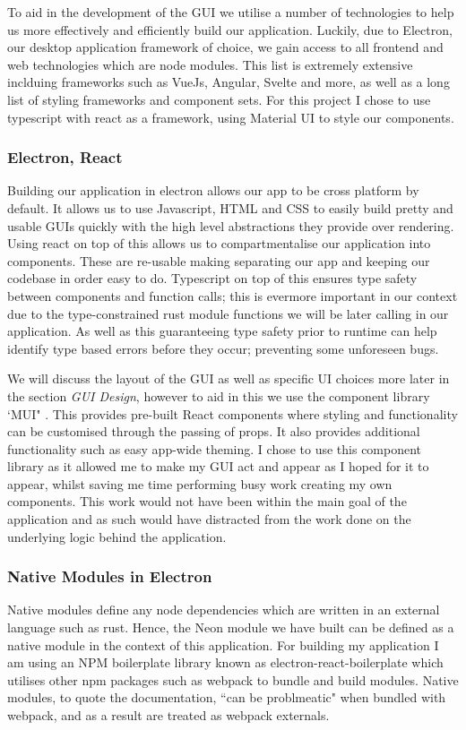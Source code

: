 \documentclass[a4paper,11pt]{article}
\begin{document}
To aid in the development of the GUI we utilise a number of technologies to help us more effectively and efficiently build our application. Luckily, due to Electron, our desktop application framework of choice, we gain access to all frontend and web technologies which are node modules. This list is extremely extensive inclduing frameworks such as VueJs, Angular, Svelte and more, as well as a long list of styling frameworks and component sets. For this project I chose to use typescript with react as a framework, using Material UI \cite{mui} to style our components.
\subsubsection{Electron, React}
Building our application in electron allows our app to be cross platform by default. It allows us to use Javascript, HTML and CSS to easily build pretty and usable GUIs quickly with the high level abstractions they provide over rendering. Using react on top of this allows us to compartmentalise our application into components. These are re-usable making separating our app and keeping our codebase in order easy to do. Typescript on top of this ensures type safety between components and function calls; this is evermore important in our context due to the type-constrained rust module functions we will be later calling in our application. As well as this guaranteeing type safety prior to runtime can help identify type based errors before they occur; preventing some unforeseen bugs.

We will discuss the layout of the GUI as well as specific UI choices more later in the section \textit{GUI Design}, however to aid in this we use the component library `MUI" \cite{mui}. This provides pre-built React components where styling and functionality can be customised through the passing of props. It also provides additional functionality such as easy app-wide theming. I chose to use this component library as it allowed me to make my GUI act and appear as I hoped for it to appear, whilst saving me time performing busy work creating my own components. This work would not have been within the main goal of the application and as such would have distracted from the work done on the underlying logic behind the application. 
\subsubsection{Native Modules in Electron}
Native modules define any node dependencies which are written in an external language such as rust. Hence, the Neon module we have built can be defined as a native module in the context of this application. For building my application I am using an NPM boilerplate library known as electron-react-boilerplate \cite{electronReactBoilerPlate} which utilises other npm packages such as webpack to bundle and build modules. Native modules, to quote the documentation, ``can be problmeatic" when bundled with webpack, and as a result are treated as webpack externals.
\end{document}
